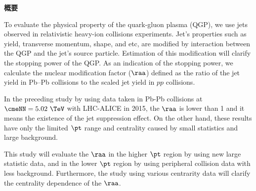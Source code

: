 \begin{center}
	\textbf{概要}
\end{center}

To evaluate the physical property of the quark-gluon plasma (QGP),
we use jets observed in relativistic heavy-ion collisions experiments.
Jet's properties such as yield, transverse momentum, shape, and etc,
are modified by interaction between the QGP and the jet's source particle.
Estimation of this modification will clarify the stopping power of the QGP.
As an indication of the stopping power, 
we calculate the nuclear modification factor ($\raa$) defined 
as the ratio of the jet yield in Pb–Pb collisions to the scaled jet yield in $pp$ collisions.

In the preceding study\cite{Osada:2019oor} by using data 
taken in Pb-Pb collisions at $\cmeNN = 5.02~\TeV$ with LHC-ALICE in 2015,
the $\raa$ is lower than 1 and it means the existence of the jet suppression effect.
On the other hand, these results have only the limited $\pt$ range and centrality 
caused by small statistics and large background.

This study will evaluate the $\raa$ in the higher $\pt$ region 
by using new large statistic data, and in the lower $\pt$ region 
by using peripheral collision data with less background.
Furthermore, the study using various centrarity data 
will clarify the centrality dependence of the $\raa$.
